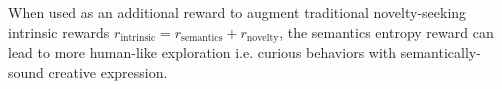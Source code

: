 




When used as an additional reward to augment traditional novelty-seeking intrinsic rewards \(r_{\text{intrinsic}} = r_{\text{semantics}} + r_{\text{novelty}}\), the semantics entropy reward can lead to more human-like exploration i.e. curious behaviors with semantically-sound creative expression.
